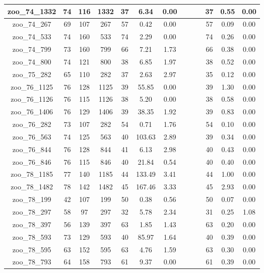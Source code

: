 \begin{landscape}
\begin{longtable}{|c|c|c|c|c|c|c|c|c|c|c|c|c|}
zoo\_74\_1332 & 74 & 116 & 1332 & 37 & 6.34 & 0.00 &  &  &  & 37 & 0.55 & 0.00 \\ \hline 
zoo\_74\_267 & 69 & 107 & 267 & 57 & 0.42 & 0.00 &  &  &  & 57 & 0.09 & 0.00 \\ \hline 
zoo\_74\_533 & 74 & 160 & 533 & 74 & 2.29 & 0.00 &  &  &  & 74 & 0.26 & 0.00 \\ \hline 
zoo\_74\_799 & 73 & 160 & 799 & 66 & 7.21 & 1.73 &  &  &  & 66 & 0.38 & 0.00 \\ \hline 
zoo\_74\_800 & 74 & 121 & 800 & 38 & 6.85 & 1.97 &  &  &  & 38 & 0.52 & 0.00 \\ \hline 
zoo\_75\_282 & 65 & 110 & 282 & 37 & 2.63 & 2.97 &  &  &  & 35 & 0.12 & 0.00 \\ \hline 
zoo\_76\_1125 & 76 & 128 & 1125 & 39 & 55.85 & 0.00 &  &  &  & 39 & 1.30 & 0.00 \\ \hline 
zoo\_76\_1126 & 76 & 115 & 1126 & 38 & 5.20 & 0.00 &  &  &  & 38 & 0.58 & 0.00 \\ \hline 
zoo\_76\_1406 & 76 & 129 & 1406 & 39 & 38.35 & 1.92 &  &  &  & 39 & 0.83 & 0.00 \\ \hline 
zoo\_76\_282 & 73 & 107 & 282 & 54 & 0.71 & 1.76 &  &  &  & 54 & 0.10 & 0.00 \\ \hline 
zoo\_76\_563 & 74 & 125 & 563 & 40 & 103.63 & 2.89 &  &  &  & 39 & 0.34 & 0.00 \\ \hline 
zoo\_76\_844 & 76 & 128 & 844 & 41 & 6.13 & 2.98 &  &  &  & 40 & 0.43 & 0.00 \\ \hline 
zoo\_76\_846 & 76 & 115 & 846 & 40 & 21.84 & 0.54 &  &  &  & 40 & 0.40 & 0.00 \\ \hline 
zoo\_78\_1185 & 77 & 140 & 1185 & 44 & 133.49 & 3.41 &  &  &  & 44 & 1.00 & 0.00 \\ \hline 
zoo\_78\_1482 & 78 & 142 & 1482 & 45 & 167.46 & 3.33 &  &  &  & 45 & 2.93 & 0.00 \\ \hline 
zoo\_78\_199 & 42 & 107 & 199 & 50 & 0.38 & 0.56 &  &  &  & 50 & 0.07 & 0.00 \\ \hline 
zoo\_78\_297 & 58 & 97 & 297 & 32 & 5.78 & 2.34 &  &  &  & 31 & 0.25 & 1.08 \\ \hline 
zoo\_78\_397 & 56 & 139 & 397 & 63 & 1.85 & 1.43 &  &  &  & 63 & 0.20 & 0.00 \\ \hline 
zoo\_78\_593 & 73 & 129 & 593 & 40 & 85.97 & 1.64 &  &  &  & 40 & 0.39 & 0.00 \\ \hline 
zoo\_78\_595 & 63 & 152 & 595 & 63 & 4.76 & 1.59 &  &  &  & 63 & 0.30 & 0.00 \\ \hline 
zoo\_78\_793 & 64 & 158 & 793 & 61 & 9.37 & 0.00 &  &  &  & 61 & 0.39 & 0.00 \\ \hline 

\end{longtable}
\end{landscape}
